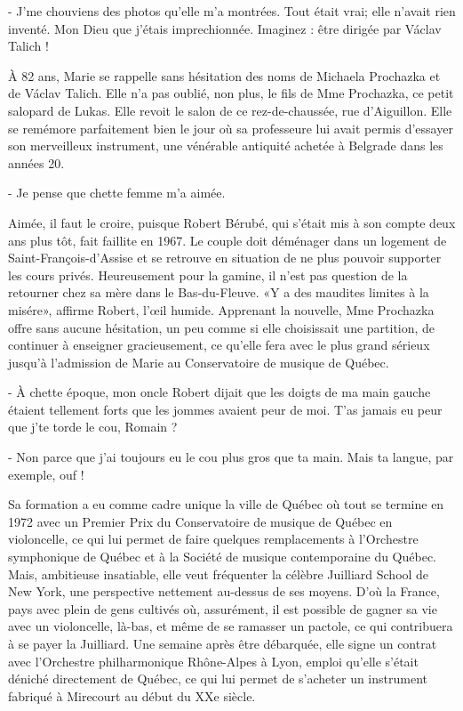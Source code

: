 - J’me chouviens des photos qu’elle m’a montrées. Tout était vrai; elle n’avait rien inventé. Mon Dieu que j’étais imprechionnée. Imaginez : être dirigée par Václav Talich !

À 82 ans, Marie se rappelle sans hésitation des noms de Michaela Prochazka et de Václav Talich. Elle n’a pas oublié, non plus, le fils de Mme Prochazka, ce petit salopard de Lukas. Elle revoit le salon de ce rez-de-chaussée, rue d’Aiguillon. Elle se remémore parfaitement bien le jour où sa professeure lui avait permis d’essayer son merveilleux instrument, une vénérable antiquité achetée à Belgrade dans les années 20.

- Je pense que chette femme m’a aimée.

Aimée, il faut le croire, puisque Robert Bérubé, qui s’était mis à son compte deux ans plus tôt, fait faillite en 1967. Le couple doit déménager dans un logement de Saint-François-d’Assise et se retrouve en situation de ne plus pouvoir supporter les cours privés. Heureusement pour la gamine, il n’est pas question de la retourner chez sa mère dans le Bas-du-Fleuve. «Y a des maudites limites à la misére», affirme Robert, l’œil humide. Apprenant la nouvelle, Mme Prochazka offre sans aucune hésitation, un peu comme si elle choisissait une partition, de continuer à enseigner gracieusement, ce qu’elle fera avec le plus grand sérieux jusqu’à l’admission de Marie au Conservatoire de musique de Québec.

- À chette époque, mon oncle Robert dijait que les doigts de ma main gauche étaient tellement forts que les jommes avaient peur de moi. T’as jamais eu peur que j’te torde le cou, Romain ?

- Non parce que j’ai toujours eu le cou plus gros que ta main. Mais ta langue, par exemple, ouf !

Sa formation a eu comme cadre unique la ville de Québec où tout se termine en 1972 avec un Premier Prix du Conservatoire de musique de Québec en violoncelle, ce qui lui permet de faire quelques remplacements à l’Orchestre symphonique de Québec et à la Société de musique contemporaine du Québec. Mais, ambitieuse insatiable, elle veut fréquenter la célèbre Juilliard School de New York, une perspective nettement au-dessus de ses moyens. D’où la France, pays avec plein de gens cultivés où, assurément, il est possible de gagner sa vie avec un violoncelle, là-bas, et même de se ramasser un pactole, ce qui contribuera à se payer la Juilliard. Une semaine après être débarquée, elle signe un contrat avec l’Orchestre philharmonique Rhône-Alpes à Lyon, emploi qu’elle s’était déniché directement de Québec, ce qui lui permet de s’acheter un instrument fabriqué à Mirecourt au début du XXe siècle. 

